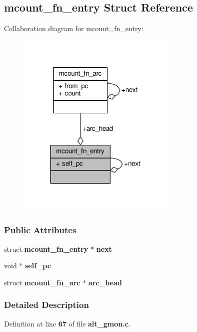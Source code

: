 \subsection{mcount\+\_\+fn\+\_\+entry Struct Reference}
\label{structmcount__fn__entry}


Collaboration diagram for mcount\+\_\+fn\+\_\+entry\+:\nopagebreak
\begin{figure}[H]
\begin{center}
\leavevmode
\includegraphics[width=215pt]{d7/df8/structmcount__fn__entry__coll__graph}
\end{center}
\end{figure}
\subsubsection*{Public Attributes}
\begin{DoxyCompactItemize}
\item 
struct {\bf mcount\+\_\+fn\+\_\+entry} $\ast$ {\bf next}
\item 
void $\ast$ {\bf self\+\_\+pc}
\item 
struct {\bf mcount\+\_\+fn\+\_\+arc} $\ast$ {\bf arc\+\_\+head}
\end{DoxyCompactItemize}


\subsubsection{Detailed Description}


Definition at line {\bf 67} of file {\bf alt\+\_\+gmon.\+c}.




